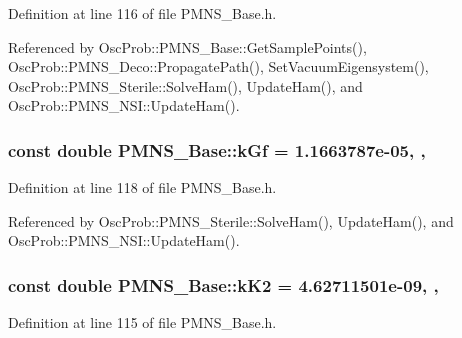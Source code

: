 Definition at line 116 of file P\+M\+N\+S\+\_\+\+Base.\+h.



Referenced by Osc\+Prob\+::\+P\+M\+N\+S\+\_\+\+Base\+::\+Get\+Sample\+Points(), Osc\+Prob\+::\+P\+M\+N\+S\+\_\+\+Deco\+::\+Propagate\+Path(), Set\+Vacuum\+Eigensystem(), Osc\+Prob\+::\+P\+M\+N\+S\+\_\+\+Sterile\+::\+Solve\+Ham(), Update\+Ham(), and Osc\+Prob\+::\+P\+M\+N\+S\+\_\+\+N\+S\+I\+::\+Update\+Ham().

\subsubsection[{\texorpdfstring{k\+Gf}{kGf}}]{\setlength{\rightskip}{0pt plus 5cm}const double P\+M\+N\+S\+\_\+\+Base\+::k\+Gf = 1.\+1663787e-\/05\hspace{0.3cm}{\ttfamily [static]}, {\ttfamily [protected]}, {\ttfamily [inherited]}}\hypertarget{classOscProb_1_1PMNS__Base_a7f26a3456128234b2ae6cc9141a6532f}{}\label{classOscProb_1_1PMNS__Base_a7f26a3456128234b2ae6cc9141a6532f}


Definition at line 118 of file P\+M\+N\+S\+\_\+\+Base.\+h.



Referenced by Osc\+Prob\+::\+P\+M\+N\+S\+\_\+\+Sterile\+::\+Solve\+Ham(), Update\+Ham(), and Osc\+Prob\+::\+P\+M\+N\+S\+\_\+\+N\+S\+I\+::\+Update\+Ham().

\subsubsection[{\texorpdfstring{k\+K2}{kK2}}]{\setlength{\rightskip}{0pt plus 5cm}const double P\+M\+N\+S\+\_\+\+Base\+::k\+K2 = 4.\+62711501e-\/09\hspace{0.3cm}{\ttfamily [static]}, {\ttfamily [protected]}, {\ttfamily [inherited]}}\hypertarget{classOscProb_1_1PMNS__Base_a326fc5016d7dd7ce05682c06cdcb6d94}{}\label{classOscProb_1_1PMNS__Base_a326fc5016d7dd7ce05682c06cdcb6d94}


Definition at line 115 of file P\+M\+N\+S\+\_\+\+Base.\+h.



